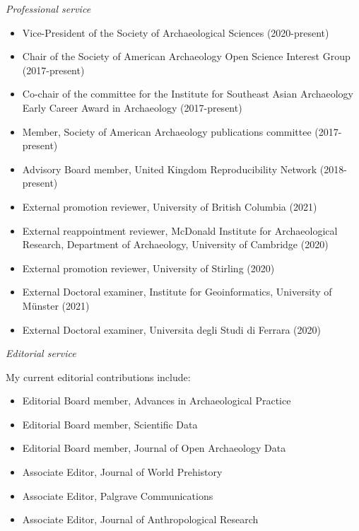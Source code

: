 \medskip

\noindent\emph{Professional service\vspace{0.01in}}

\medskip

\begin{itemize}[noitemsep, font=$\bullet$\scshape\bfseries]

\item Vice-President of the Society of Archaeological Sciences (2020-present)

\item Chair of the Society of American Archaeology Open Science Interest Group (2017-present)

\item Co-chair of the committee for the Institute for Southeast Asian Archaeology Early Career Award in Archaeology (2017-present)

\item Member, Society of American Archaeology publications committee (2017-present)

\item Advisory Board member, United Kingdom Reproducibility Network (2018-present)

\item External promotion reviewer, University of British Columbia (2021)

\item External reappointment reviewer, McDonald Institute for Archaeological Research, Department of Archaeology, University of Cambridge (2020)

\item External promotion reviewer, University of Stirling (2020)

\item External Doctoral examiner, Institute for Geoinformatics, University of Münster (2021)

\item External Doctoral examiner, Universita degli Studi di Ferrara (2020)

\end{itemize}

\medskip

\noindent\emph{Editorial service\vspace{0.01in}}

\medskip

My current editorial contributions include:

\begin{itemize}[noitemsep, font=$\bullet$\scshape\bfseries]
\item Editorial Board member, Advances in Archaeological Practice
\item Editorial Board member, Scientific Data
\item Editorial Board member, Journal of Open Archaeology Data
\item Associate Editor, Journal of World Prehistory
\item Associate Editor, Palgrave Communications 
\item Associate Editor, Journal of Anthropological Research
\end{itemize}

